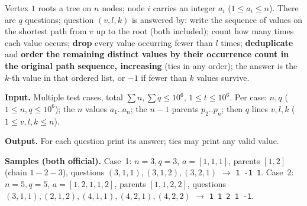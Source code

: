 \begin{problemstatement}
Vertex \(1\) roots a tree on \(n\) nodes; node \(i\) carries an integer \(a_i\)
(\(1\le a_i\le n\)). There are \(q\) questions; question \((v,l,k)\) is answered by:
write the sequence of values on the shortest path from \(v\) up to the root (both
included); count how many times each value occurs; \textbf{drop} every value occurring
fewer than \(l\) times; \textbf{deduplicate} and \textbf{order the remaining distinct
values by their occurrence count in the original path sequence, increasing} (ties in any
order); the answer is the \(k\)-th value in that ordered list, or \(-1\) if fewer than
\(k\) values survive.

\textbf{Input.} Multiple test cases, total \(\sum n,\sum q\le 10^6\), \(1\le t\le10^6\).
Per case: \(n,q\) (\(1\le n,q\le10^6\)); the \(n\) values \(a_1..a_n\); the \(n-1\)
parents \(p_2..p_n\); then \(q\) lines \(v,l,k\) (\(1\le v,l,k\le n\)).

\textbf{Output.} For each question print its answer; ties may print any valid value.

\textbf{Samples (both official).} Case~1: \(n{=}3,q{=}3\), \(a{=}[1,1,1]\), parents
\([1,2]\) (chain \(1\!-\!2\!-\!3\)), questions \((3,1,1),(3,1,2),(3,2,1)\) \(\to\)
\texttt{1 -1 1}. Case~2: \(n{=}5,q{=}5\), \(a{=}[1,2,1,1,2]\), parents \([1,1,2,2]\),
questions \((3,1,1),(2,1,2),(4,1,1),(4,2,1),(4,2,2)\) \(\to\) \texttt{1 1 2 1 -1}.
\end{problemstatement}

